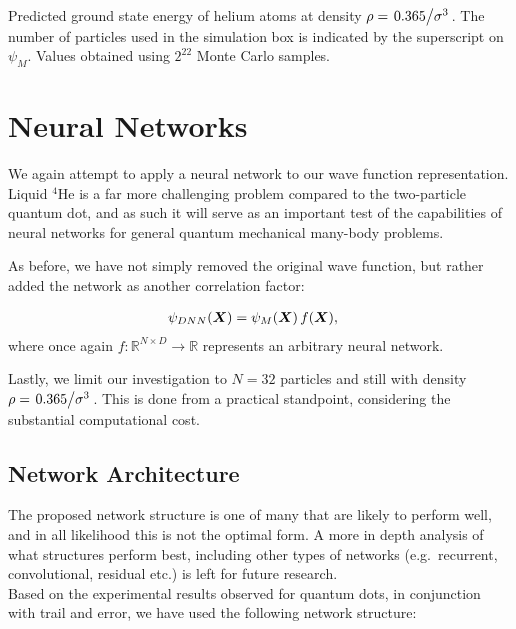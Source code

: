 \documentclass[Thesis.tex]{subfiles}
\begin{document}
\begin{table}[h]
  \centering
  \caption{\label{tab:He-benchmark-results}Predicted ground state energy of helium atoms at density $\rho =
\flatfrac{0.365}{\sigma^3}$. The number of particles used in the simulation box
is indicated by the superscript on $\psi_M$. Values obtained using $2^{22}$
Monte Carlo samples.}
  
\end{table}


\section{Neural Networks}

We again attempt to apply a neural network to our wave function representation.
Liquid $^4$He is a far more challenging problem compared to the two-particle
quantum dot, and as such it will serve as an important test of the capabilities
of neural networks for general quantum mechanical many-body problems.

As before, we have not simply removed the original wave function, but rather
added the network as another correlation factor:

\begin{align}
  \label{eq:helium-dnn-mcmillan-def}
  \psi_{DNN}(\bm{X}) &= \psi_M(\bm{X})\,f(\bm{X}),
\end{align}
where once again $f: \mathbb{R}^{N\times D}\to\mathbb{R}$ represents an
arbitrary neural network. 

Lastly, we limit our investigation to $N=32$ particles and still with density
$\rho=\flatfrac{0.365}{\sigma^3}$. This is done from a practical standpoint,
considering the substantial computational cost.

\subsection{Network Architecture}

The proposed network structure is one of many that are likely to perform well,
and in all likelihood this is not the optimal form. A more in depth analysis of
what structures perform best, including other types of networks (e.g.\ recurrent,
convolutional, residual etc.) is left for future research.\\

Based on the experimental results observed for quantum dots, in conjunction with
trail and error, we have used the following network structure:
\end{document}
